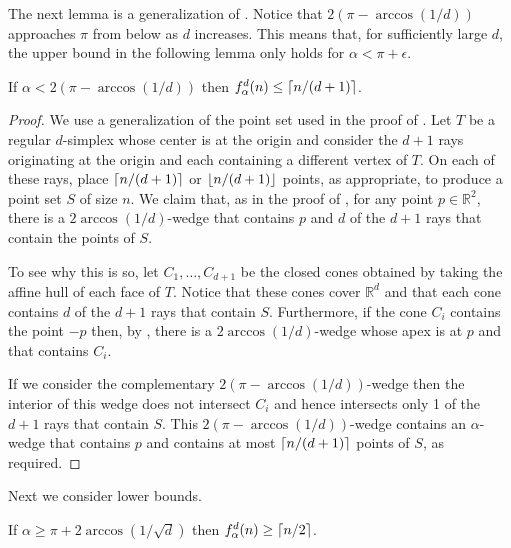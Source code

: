 \documentclass[lotsofwhite]{patmorin}
\begin{document}
The next lemma is a generalization of .  Notice that
$2(\pi-\arccos(1/d))$ approaches $\pi$ from below as $d$ increases.  This
means that, for sufficiently large $d$, the upper bound in the
following lemma only holds for $\alpha < \pi+\epsilon$.

\begin{lem}
If $\alpha < 2(\pi-\arccos(1/d))$ then $f^d_\alpha(n) \le \left\lceil n/(d+1) \right\rceil$.
\end{lem}

\begin{proof} 
We use a generalization of the point set used in the proof of
.  Let $T$ be a regular $d$-simplex whose center is at the
origin and consider the $d+1$ rays originating at the origin and each
containing a different vertex of $T$.  On each of these rays, place
$\left\lceil n/(d+1) \right\rceil$ or $\left\lfloor n/(d+1) \right\rfloor$ points, as appropriate, to
produce a point set $S$ of size $n$.  We claim that, as in the proof
of , for any point $p\in\mathbb{R}^2$, there is a
$2\arccos(1/d)$-wedge that contains $p$ and $d$ of the $d+1$ rays that
contain the points of $S$. 

To see why this is so, let $C_1,\ldots,C_{d+1}$ be the closed cones
obtained by taking the affine hull of each face of $T$.  Notice that
these cones cover $\mathbb{R}^d$ and that each cone contains $d$ of
the $d+1$ rays that contain $S$.  Furthermore, if the cone $C_i$
contains the point $-p$ then, by , there is a
$2\arccos(1/d)$-wedge whose apex is at $p$ and that contains $C_i$.  

If we consider the complementary $2(\pi-\arccos(1/d))$-wedge then the
interior of this wedge does not intersect $C_i$ and hence intersects
only 1 of the $d+1$ rays that contain $S$. This
$2(\pi-\arccos(1/d))$-wedge contains an $\alpha$-wedge that contains $p$
and contains at most $\left\lceil n/(d+1) \right\rceil$ points of $S$, as required.
\end{proof}

Next we consider lower bounds.

\begin{lem}
If $\alpha \ge \pi+2\arccos(1/\sqrt{d})$ then $f_\alpha^d(n)\ge \left\lceil n/2 \right\rceil$.
\end{lem}
\end{document}
